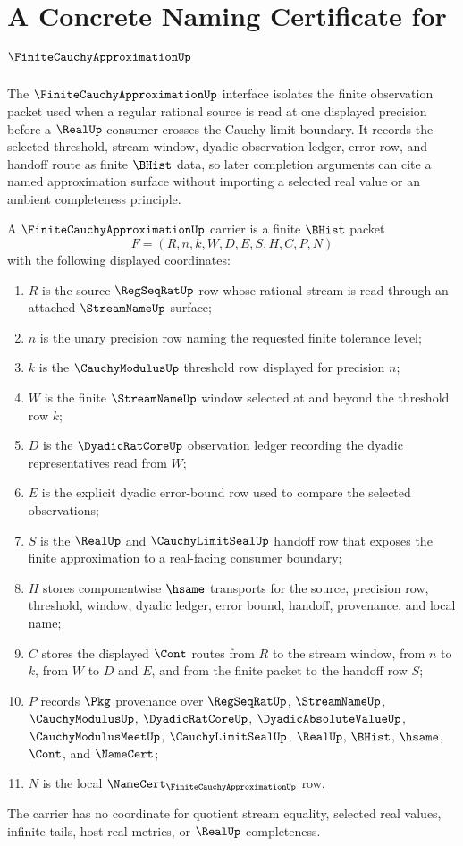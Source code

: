 \chapter{A Concrete Naming Certificate for $\FiniteCauchyApproximationUp$}
\label{ch:concrete-instances-finite-cauchy-approximation-namecert}

The $\FiniteCauchyApproximationUp$ interface isolates the finite observation packet used when a regular rational source is read at one displayed precision before a $\RealUp$ consumer crosses the Cauchy-limit boundary. It records the selected threshold, stream window, dyadic observation ledger, error row, and handoff route as finite $\BHist$ data, so later completion arguments can cite a named approximation surface without importing a selected real value or an ambient completeness principle.

\begin{definition}
\label{def:finite-cauchy-approximation-carrier}
A $\FiniteCauchyApproximationUp$ carrier is a finite $\BHist$ packet
$$
F=(R,n,k,W,D,E,S,H,C,P,N)
$$
with the following displayed coordinates:
\begin{enumerate}
\item $R$ is the source $\RegSeqRatUp$ row whose rational stream is read through an attached $\StreamNameUp$ surface;
\item $n$ is the unary precision row naming the requested finite tolerance level;
\item $k$ is the $\CauchyModulusUp$ threshold row displayed for precision $n$;
\item $W$ is the finite $\StreamNameUp$ window selected at and beyond the threshold row $k$;
\item $D$ is the $\DyadicRatCoreUp$ observation ledger recording the dyadic representatives read from $W$;
\item $E$ is the explicit dyadic error-bound row used to compare the selected observations;
\item $S$ is the $\RealUp$ and $\CauchyLimitSealUp$ handoff row that exposes the finite approximation to a real-facing consumer boundary;
\item $H$ stores componentwise $\hsame$ transports for the source, precision row, threshold, window, dyadic ledger, error bound, handoff, provenance, and local name;
\item $C$ stores the displayed $\Cont$ routes from $R$ to the stream window, from $n$ to $k$, from $W$ to $D$ and $E$, and from the finite packet to the handoff row $S$;
\item $P$ records $\Pkg$ provenance over $\RegSeqRatUp$, $\StreamNameUp$, $\CauchyModulusUp$, $\DyadicRatCoreUp$, $\DyadicAbsoluteValueUp$, $\CauchyModulusMeetUp$, $\CauchyLimitSealUp$, $\RealUp$, $\BHist$, $\hsame$, $\Cont$, and $\NameCert$;
\item $N$ is the local $\NameCert_{\FiniteCauchyApproximationUp}$ row.
\end{enumerate}
The carrier has no coordinate for quotient stream equality, selected real values, infinite tails, host real metrics, or $\RealUp$ completeness.
\end{definition}

